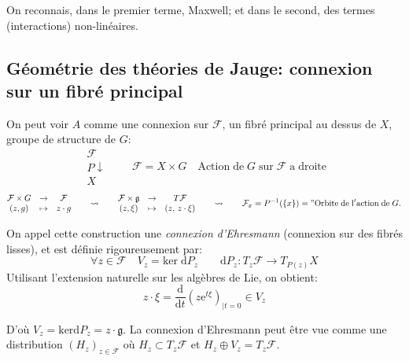 \documentclass[a4paper,11pt]{article}
\renewcommand{\d}{{\mathrm{d}}}
\newcommand{\e}{{\mathrm{e}}}
\begin{document}
On reconnais, dans le premier terme, Maxwell; et dans le second, des termes (interactions) non-linéaires.

\subsection{Géométrie des théories de Jauge: connexion sur un fibré principal}
On peut voir $A$ comme une connexion sur $\mathcal{F}$, un fibré principal au dessus de $X$, groupe de structure de $G$:
$$\begin{matrix}
\mathcal{F}\\
P \downarrow \quad \\
X
\end{matrix}\quad \mathcal{F}=X\times G
\quad \mathrm{Action}\;\mathrm{de}\;G\;\mathrm{sur}\;\mathcal{F}\; \mathrm{a} \;\mathrm{droite}$$
$$\begin{matrix}
\mathcal{F}\times G & \to & \mathcal{F}\\
(z,g) & \mapsto & z \cdot g
\end{matrix}
\quad\quad \rightsquigarrow \quad\quad
\begin{matrix}
\mathcal{F}\times \mathfrak{g} & \to & T\mathcal{F}\\
(z,\xi) & \mapsto & (z,\,z \cdot \xi)
\end{matrix}
\quad\quad \rightsquigarrow \quad\quad
\mathcal{F}_x = P^{-1}(\{x\}) = "\mathrm{Orbite}\;\mathrm{de}\;\mathrm{l}'\mathrm{action}\;\mathrm{de}\; G.
$$

On appel cette construction une \emph{connexion d'Ehresmann} (connexion sur des fibrés lisses), et est définie rigoureusement par:
$$\forall z \in \mathcal{F} \quad V_z = \mathrm{ker} \; \d P_z \quad \quad \d P_z : T_z \mathcal{F} \to T_{P(z)} X$$
Utilisant l'extension naturelle sur les algèbres de Lie, on obtient:
$$z\cdot \xi = \frac{\d}{\d t}\left(z\e^{t\xi}\right)_{|t=0} \in V_z$$

D'où
$V_z = \mathrm{ker} \d P_z = z \cdot \mathfrak{g}$. 
La connexion d'Ehresmann peut être vue comme une distribution $(H_z)_{z\in\mathcal{F}}$ où $H_z \subset T_z \mathcal{F}$ et $H_z \oplus V_z = T_z \mathcal{F}$.
\end{document}
